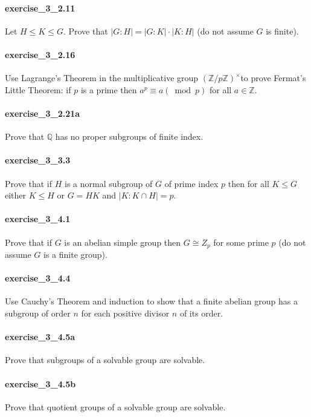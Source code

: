 \documentclass{article}
\begin{document}
\paragraph{exercise\_3\_2.11} Let $H \leq K \leq G$. Prove that $|G: H|=|G: K| \cdot|K: H|$ (do not assume $G$ is finite).

\paragraph{exercise\_3\_2.16} Use Lagrange's Theorem in the multiplicative group $(\mathbb{Z} / p \mathbb{Z})^{\times}$to prove Fermat's Little Theorem: if $p$ is a prime then $a^{p} \equiv a(\bmod p)$ for all $a \in \mathbb{Z}$.

\paragraph{exercise\_3\_2.21a} Prove that $\mathbb{Q}$ has no proper subgroups of finite index.

\paragraph{exercise\_3\_3.3} Prove that if $H$ is a normal subgroup of $G$ of prime index $p$ then for all $K \leq G$ either $K \leq H$ or $G=H K$ and $|K: K \cap H|=p$.

\paragraph{exercise\_3\_4.1} Prove that if $G$ is an abelian simple group then $G \cong Z_{p}$ for some prime $p$ (do not assume $G$ is a finite group).

\paragraph{exercise\_3\_4.4} Use Cauchy's Theorem and induction to show that a finite abelian group has a subgroup of order $n$ for each positive divisor $n$ of its order.

\paragraph{exercise\_3\_4.5a} Prove that subgroups of a solvable group are solvable.

\paragraph{exercise\_3\_4.5b} Prove that quotient groups of a solvable group are solvable.
\end{document}
